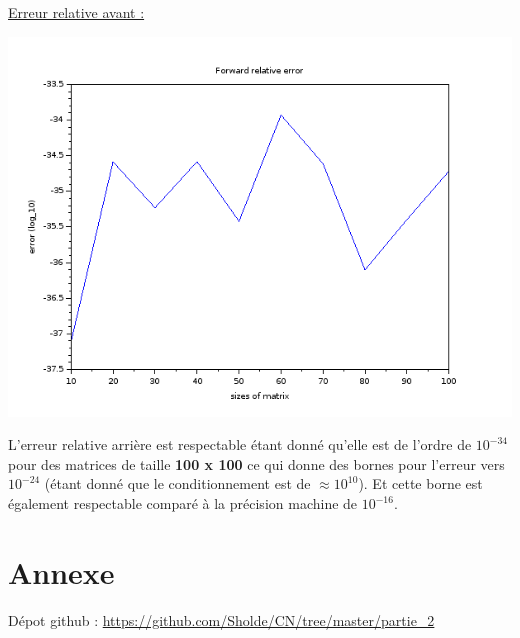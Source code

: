 \documentclass[12pt, letterpaper]{article}
\begin{document}
\underline{Erreur relative avant :}

\includegraphics[scale=0.5]{img/lu_compact_error.png}

L'erreur relative arrière est respectable étant donné qu'elle est de
l'ordre de $10^{-34}$ pour des matrices de taille \textbf{100 x 100} ce
qui donne des bornes pour l'erreur vers $10^{-24}$ (étant donné
que le conditionnement est de $\approx 10^{10}$). Et cette
borne est également respectable comparé à la précision machine de
$10^{-16}$.

\section*{Annexe}

Dépot github : \url{https://github.com/Sholde/CN/tree/master/partie_2}
\end{document}
